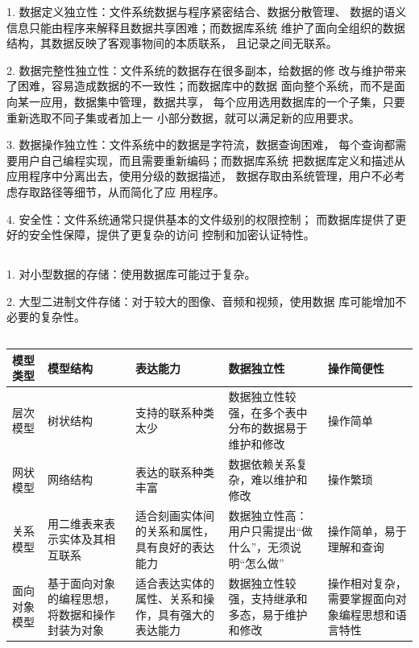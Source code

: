 \documentclass[UTF8]{ctexart}
\begin{document}
1. 数据定义独立性：文件系统数据与程序紧密结合、数据分散管理、
数据的语义信息只能由程序来解释且数据共享困难；而数据库系统
维护了面向全组织的数据结构，其数据反映了客观事物间的本质联系，
且记录之间无联系。

2. 数据完整性独立性：文件系统的数据存在很多副本，给数据的修
改与维护带来了困难，容易造成数据的不一致性；而数据库中的数据
面向整个系统，而不是面向某一应用，数据集中管理，数据共享，
每个应用选用数据库的一个子集，只要重新选取不同子集或者加上一
小部分数据，就可以满足新的应用要求。

3. 数据操作独立性：文件系统中的数据是字符流，数据查询困难，
每个查询都需要用户自己编程实现，而且需要重新编码；而数据库系统
把数据库定义和描述从应用程序中分离出去，使用分级的数据描述，
数据存取由系统管理，用户不必考虑存取路径等细节，从而简化了应
用程序。

4. 安全性：文件系统通常只提供基本的文件级别的权限控制；
而数据库提供了更好的安全性保障，提供了更复杂的访问
控制和加密认证特性。

\subsection{}

1. 对小型数据的存储：使用数据库可能过于复杂。

2. 大型二进制文件存储：对于较大的图像、音频和视频，使用数据
库可能增加不必要的复杂性。

\subsection{}

\begin{tabularx}{\linewidth}{|X|X|X|X|X|}
\hline
模型类型 & 模型结构 & 表达能力 & 数据独立性 & 操作简便性\\
\hline
层次模型    
& 树状结构 
& 支持的联系种类太少 
& 数据独立性较强，在多个表中分布的数据易于维护和修改 
& 操作简单\\
\hline
网状模型    
& 网络结构 
& 表达的联系种类丰富 
& 数据依赖关系复杂，难以维护和修改 
& 操作繁琐\\
\hline
关系模型    
& 用二维表来表示实体及其相互联系 
& 适合刻画实体间的关系和属性，具有良好的表达能力 
& 数据独立性高：用户只需提出“做什么”，无须说明“怎么做” 
& 操作简单，易于理解和查询\\
\hline
面向对象模型 
& 基于面向对象的编程思想，将数据和操作封装为对象 
& 适合表达实体的属性、关系和操作，具有强大的表达能力 
& 数据独立性较强，支持继承和多态，易于维护和修改 
& 操作相对复杂，需要掌握面向对象编程思想和语言特性\\
\hline
\end{tabularx}
\end{document}
